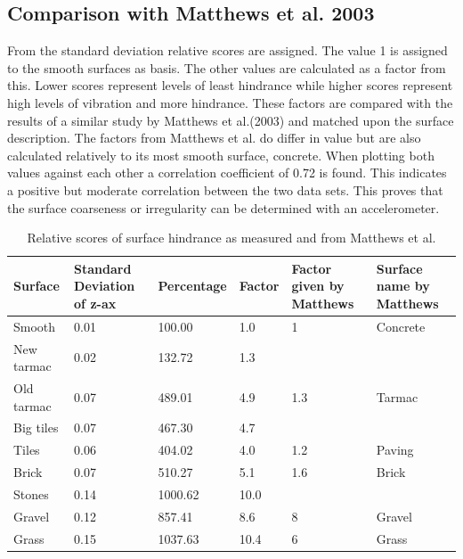 \clearpage

\subsection{Comparison with Matthews et al. 2003}
From the standard deviation relative scores are assigned. The value 1 is assigned to the smooth surfaces as basis. The other values are calculated as a factor from this. Lower scores represent levels of least hindrance while higher scores represent high levels of vibration and more hindrance. These factors are compared with the results of a similar study by Matthews et al.(2003) and matched upon the surface description. The factors from Matthews et al. do differ in value but are also calculated relatively to its most smooth surface, concrete. When plotting both values against each other a correlation coefficient of 0.72 is found. This indicates a positive but moderate correlation between the two data sets. This proves that the surface coarseness or irregularity can be determined with an accelerometer. 

\begin{table}[hb]
\caption{Relative scores of surface hindrance as measured and from Matthews et al. \label{compare}}
\centering
\begin{tabular}{|p{67.6pt}|p{55.6pt}|p{55.6pt}|p{55.6pt}|p{55.6pt}|p{55.6pt}|}
\hline
Surface & Standard Deviation of z-ax & Percentage & Factor & Factor given by Matthews & Surface name by Matthews \\
\hline
Smooth & 0.01 & 100.00 & 1.0 & 1 & Concrete \\
New tarmac & 0.02 & 132.72 & 1.3 & & \\
Old tarmac & 0.07 & 489.01 & 4.9 & 1.3 & Tarmac \\
Big tiles & 0.07 & 467.30 & 4.7 & & \\
Tiles & 0.06 & 404.02 & 4.0 & 1.2 & Paving \\
Brick & 0.07 & 510.27 & 5.1 & 1.6 & Brick \\
Stones & 0.14 & 1000.62 & 10.0 & & \\
Gravel & 0.12 & 857.41 & 8.6 & 8 & Gravel \\
Grass & 0.15 & 1037.63 & 10.4 & 6 & Grass \\
\hline 
\end{tabular}
\end{table}


